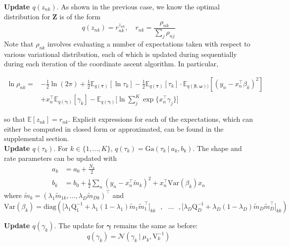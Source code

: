 \documentclass[twoside,11pt]{article}
\newcommand{\tr}{\intercal}
\newcommand\given[1][]{\:#1\vert\:}
\newcommand{\transpose}[1]{#1^{\intercal}}
\newcommand{\nsum}{\sum\limits_{n}}
\newcommand{\boldbeta}{\boldsymbol\beta}
\newcommand{\boldgamma}{\boldsymbol\gamma}
\newcommand{\E}{\mathbb{E}}
\newcommand{\qmat}{\mathrm{Q}}
\newcommand{\var}[1]{\mathrm{Var}\left(#1\right)}
\begin{document}
\textbf{Update $q \left( z_{nk} \right)$}. As shown in the previous case, we know the optimal distribution for $\mathbf{Z}$ is of the form
$$q(z_{nk}) = r_{nk}^{z_{nk}}, \quad r_{nk} = \frac{\rho_{nk}}{\sum_{j} \rho_{nj}}$$ 
Note that $\rho_{nk}$ involves evaluating a number of expectations taken with respect to various variational distribution, each of which is updated during sequentially during each iteration of the coordinate ascent algorithm. In particular, 

\begin{equation} \label{eq:ln_rho_vs}
\begin{split}
 \ln \rho_{nk} = &-\frac{1}{2}\ln(2\pi) + \frac{1}{2} \E_{q(\boldsymbol\tau)}[ \ln \tau_k ] - \frac{1}{2} \E_{q(\boldsymbol\tau)}[\tau_k] \cdot \E_{q(\boldbeta, \boldsymbol\omega))}[(y_n - x_n^{\tr}\beta_k)^2] \\ 
	& + x_n^{\tr}\E_{q(\boldsymbol\gamma)}[\gamma_k] - \E_{q(\boldsymbol\gamma)}\Bigg[\ln \sum_{j}^K \exp \{ x_n^{\tr} \gamma_j \}\Bigg]
\end{split}
\end{equation}

so that $\E[z_{nk}] = r_{nk}$. Explicit expressions for each of the expectations, which can either be computed in closed form or approximated, can be found in the supplemental section. \\


\textbf{Update $q \left(  \tau_k \right)$}. For $k \in \{1, \ldots, K \}$, $q(\tau_k) = \mathrm{Ga}\left( \tau_k \given a_k, b_k \right)$. The shape and rate parameters can be updated with
\begin{align}
	a_k &= a_0 + \frac{N_k}{2} \label{eq:ak_vs} \\
	b_k &= b_0 + \frac{1}{2} \nsum (y_n -\transpose{x_n} \tilde{m}_k)^2 + \transpose{x_n}\var{\beta_k} x_n \label{eq:bk_vs}
\end{align}
where $\tilde{m}_k = \transpose{\left( \lambda_1 \tilde{m}_{1k}, \ldots, \lambda_D \tilde{m}_{Dk} \right)}$ and $$\var{\beta_k} = \mathrm{diag} \left( \Big[ \lambda_1 \qmat_1^{-1} + \lambda_1(1 - \lambda_1) \tilde{m}_1 \transpose{\tilde{m}_1}\Big]_{kk} \textrm{ }, \textrm{ }\ldots\textrm{ }, \Big[ \lambda_D \qmat_D^{-1} + \lambda_D(1 - \lambda_D) \tilde{m}_D \transpose{\tilde{m}_D}\Big]_{kk} \right)$$ 

\textbf{Update $q \left(  \gamma_k \right)$}. The update for $\boldgamma$ remains the same as before:
\begin{equation} \label{optimal_gmama_vs}
	q(\gamma_k) = \mathcal{N} \left( \gamma_k \given \mu_k, \mathrm{V}_k^{-1} \right)
\end{equation}
\end{document}
